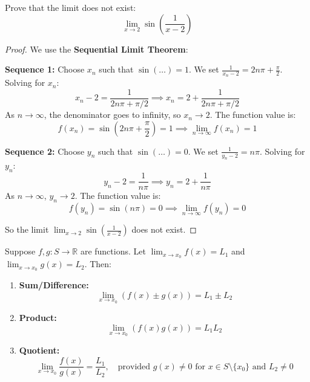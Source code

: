 \documentclass[
	UTF-8,
	11pt, %
	a4paper, %
]{LegrandOrangeBook}
\begin{document}
    \begin{example}
    Prove that the limit does not exist:
    \[ \lim_{x \to 2} \sin \left( \frac{1}{x-2} \right) \]

    \begin{proof}
        We use the \textbf{Sequential Limit Theorem}:

        \textbf{Sequence 1:} Choose $x_n$ such that $\sin(\dots) = 1$.
        We set $\frac{1}{x_n - 2} = 2n\pi + \frac{\pi}{2}$. Solving for $x_n$:
        \[ x_n - 2 = \frac{1}{2n\pi + \pi/2} \implies x_n = 2 + \frac{1}{2n\pi + \pi/2} \]
        As $n \to \infty$, the denominator goes to infinity, so $x_n \to 2$.
        The function value is:
        \[ f(x_n) = \sin \left( 2n\pi + \frac{\pi}{2} \right) = 1 \implies \lim_{n \to \infty} f(x_n) = 1 \]

        \textbf{Sequence 2:} Choose $y_n$ such that $\sin(\dots) = 0$.
        We set $\frac{1}{y_n - 2} = n\pi$. Solving for $y_n$:
        \[ y_n - 2 = \frac{1}{n\pi} \implies y_n = 2 + \frac{1}{n\pi} \]
        As $n \to \infty$, $y_n \to 2$.
        The function value is:
        \[ f(y_n) = \sin(n\pi) = 0 \implies \lim_{n \to \infty} f(y_n) = 0 \]

        So the limit $\lim_{x \to 2} \sin \left( \frac{1}{x-2} \right)$ does not exist.
    \end{proof}
    \end{example}

    \newpage

    \begin{theorem}
    Suppose $f, g: S \to \mathbb{R}$ are functions. Let $\lim_{x \to x_0} f(x) = L_1$ and $\lim_{x \to x_0} g(x) = L_2$. Then:

    \begin{enumerate}
        \item \textbf{Sum/Difference:} 
        \[ \lim_{x \to x_0} (f(x) \pm g(x)) = L_1 \pm L_2 \]
        
        \item \textbf{Product:} 
        \[ \lim_{x \to x_0} (f(x) g(x)) = L_1 L_2 \]
        
        \item \textbf{Quotient:} 
        \[ \lim_{x \to x_0} \frac{f(x)}{g(x)} = \frac{L_1}{L_2}, \quad \text{provided } g(x) \neq 0 \text{ for } x \in S \setminus \{x_0\} \text{ and } L_2 \neq 0 \]
    \end{enumerate}
    \end{theorem}
\end{document}
